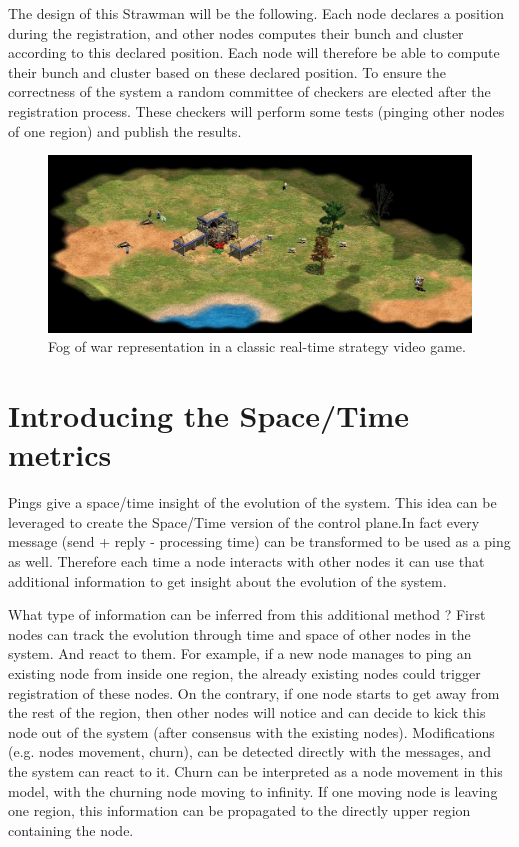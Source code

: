 \documentclass[a4paper,11pt,oneside]{report}
\begin{document}
The design of this Strawman will be the following. Each node declares a
position during the registration, and other nodes computes their bunch and
cluster according to this declared position. Each node will therefore be able
to compute their bunch and cluster based on these declared position. To ensure
the correctness of the system a random committee of checkers are elected after
the registration process. These checkers will perform some tests (pinging other
nodes of one region) and publish the results. 

\begin{figure}[!h] 
\centering
\includegraphics[width=400pt]{figures/fog_of_war}
\caption{Fog of war representation in a classic real-time strategy video game. }
\label{fig:registrationprotocol}
\end{figure}

\section{Introducing the Space/Time metrics}

Pings give a space/time insight of the evolution of the system.  This idea can
be leveraged to create the Space/Time version of the control plane.In fact
every message (send + reply - processing time) can be transformed to be used as
a ping as well. Therefore each time a node interacts with other nodes it can
use that additional information to get insight about the evolution of the
system. 

What type of information can be inferred from this additional method ? First
nodes can track the evolution through time and space of other nodes in the
system. And react to them. For example, if a new node manages to ping an
existing node from inside one region, the already existing nodes could trigger
registration of these nodes. On the contrary, if one node starts to get away
from the rest of the region, then other nodes will notice and can decide to
kick this node out of the system (after consensus with the existing nodes).
Modifications (e.g. nodes movement, churn), can be detected directly with the
messages, and the system can react to it. Churn can be interpreted as a node
movement in this model, with the churning node moving to infinity. If one
moving node is leaving one region, this information can be propagated to the
directly upper region containing the node. 
\end{document}
